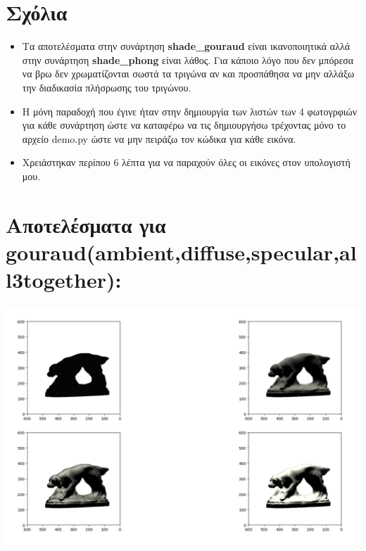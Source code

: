 \documentclass[10pt,a4paper]{article}
\begin{document}
\section*{Σχόλια}
\begin{itemize}
  \item Τα αποτελέσματα στην συνάρτηση \textbf{\textlatin{shade\_gouraud}} είναι ικανοποιητικά αλλά στην συνάρτηση \textbf{\textlatin{shade\_phong}} είναι λάθος. Για κάποιο λόγο που δεν μπόρεσα να βρω δεν χρωματίζονται σωστά τα τριγώνα αν και προσπάθησα να μην αλλάξω την διαδικασία πλήσρωσης του τριγώνου.
  \item Η μόνη παραδοχή που έγινε ήταν στην δημιουργία των λιστών των 4 φωτογρφιών για κάθε συνάρτηση ώστε να καταφέρω να τις δημιουργήσω τρέχοντας μόνο το αρχείο \textlatin{demo.py} ώστε να μην πειράζω τον κώδικα για κάθε εικόνα.
  \item Χρειάστηκαν περίπου 6  λέπτα για να παραχούν όλες οι εικόνες στον υπολογιστή μου.
\end{itemize}

\section*{Αποτελέσματα για \textlatin{gouraud(ambient,diffuse,specular,all3together)}:} 

\includegraphics[scale=0.35]{gouraud.png}
\end{document}

